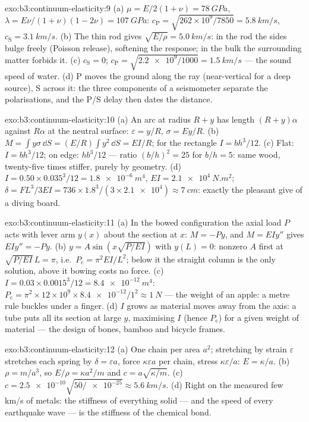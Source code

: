 \begin{solution}{exo:b3:continuum-elasticity:9}
(a) $\mu = E/2(1+\nu) = \qty{78}{GPa}$, $\lambda = E\nu/(1+\nu)(1-2\nu)
= \qty{107}{GPa}$: $c_{\text{P}} = \sqrt{262\times10^9/7850} =
\qty{5.8}{km/s}$, $c_{\text{S}} = \qty{3.1}{km/s}$. (b) The thin rod
gives $\sqrt{E/\rho} = \qty{5.0}{km/s}$: in the rod the sides bulge
freely (Poisson release), softening the response; in the bulk the
surrounding matter forbids it. (c) $c_{\text{S}} = 0$;
$c_{\text{P}} = \sqrt{\num{2.2e9}/1000} = \qty{1.5}{km/s}$ --- the
sound speed of water. (d) P moves the ground along the ray
(near-vertical for a deep source), S across it: the three components
of a seismometer separate the polarisations, and the P/S delay then
dates the distance.
\end{solution}

\begin{solution}{exo:b3:continuum-elasticity:10}
(a) An arc at radius $R + y$ has length $(R + y)\alpha$ against
$R\alpha$ at the neutral surface: $\varepsilon = y/R$, $\sigma =
Ey/R$. (b) $M = \int y\sigma\,\dd S = (E/R)\int y^2\,\dd S = EI/R$;
for the rectangle $I = bh^3/12$. (c) Flat: $I = bh^3/12$; on edge:
$hb^3/12$ --- ratio $(b/h)^2 = 25$ for $b/h = 5$: same wood, twenty-five
times stiffer, purely by geometry. (d) $I = 0.50 \times
0.035^3/12 = \qty{1.8e-6}{m^4}$, $EI = \qty{2.1e4}{N.m^2}$; $\delta =
FL^3/3EI = 736 \times 1.8^3/(3 \times \num{2.1e4}) \approx
\qty{7}{cm}$: exactly the pleasant give of a diving board.
\end{solution}

\begin{solution}{exo:b3:continuum-elasticity:11}
(a) In the bowed configuration the axial load $P$ acts with lever arm
$y(x)$ about the section at $x$: $M = -Py$, and $M = EIy''$ gives
$EIy'' = -Py$. (b) $y = A\sin(x\sqrt{P/EI})$ with $y(L) = 0$: nonzero
$A$ first at $\sqrt{P/EI}\,L = \pi$, i.e.\ $P_{\text{c}} =
\pi^2EI/L^2$; below it the straight column is the only solution, above
it bowing costs no force. (c) $I = 0.03 \times 0.0015^3/12 =
\qty{8.4e-12}{m^4}$: $P_{\text{c}} = \pi^2 \times 12\times10^9 \times
\num{8.4e-12}/1^2 \approx \qty{1}{N}$ --- the weight of an apple: a
metre rule buckles under a finger. (d) $I$ grows as material moves
away from the axis: a tube puts all its section at large $y$,
maximising $I$ (hence $P_{\text{c}}$) for a given weight of material
--- the design of bones, bamboo and bicycle frames.
\end{solution}

\begin{solution}{exo:b3:continuum-elasticity:12}
(a) One chain per area $a^2$; stretching by strain $\varepsilon$
stretches each spring by $\delta = \varepsilon a$, force $\kappa
\varepsilon a$ per chain, stress $\kappa\varepsilon/a$: $E =
\kappa/a$. (b) $\rho = m/a^3$, so $E/\rho = \kappa a^2/m$ and $c =
a\sqrt{\kappa/m}$. (c) $c = \num{2.5e-10}\sqrt{50/\num{e-25}} \approx
\qty{5.6}{km/s}$. (d) Right on the measured few km/s of metals: the
stiffness of everything solid --- and the speed of every earthquake
wave --- is the stiffness of the chemical bond.
\end{solution}


